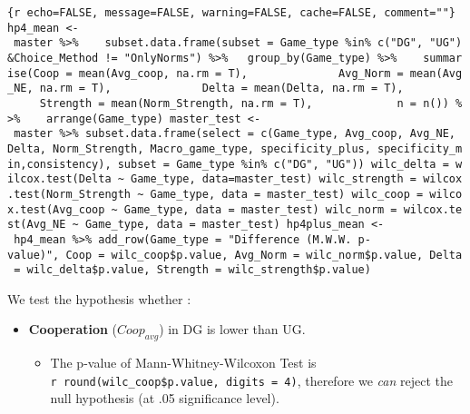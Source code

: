 \texttt{\{r\ echo=FALSE,\ message=FALSE,\ warning=FALSE,\ cache=FALSE,\ comment=""\}\ hp4\_mean\ \textless{}-\ master\ \%\textgreater{}\%\ \ \ \ subset.data.frame(subset\ =\ Game\_type\ \%in\%\ c("DG",\ "UG")\&Choice\_Method\ !=\ "OnlyNorms")\ \%\textgreater{}\%\ \ \ group\_by(Game\_type)\ \%\textgreater{}\%\ \ \ \ summarise(Coop\ =\ mean(Avg\_coop,\ na.rm\ =\ T),\ \ \ \ \ \ \ \ \ \ \ \ \ \ Avg\_Norm\ =\ mean(Avg\_NE,\ na.rm\ =\ T),\ \ \ \ \ \ \ \ \ \ \ \ \ \ Delta\ =\ mean(Delta,\ na.rm\ =\ T),\ \ \ \ \ \ \ \ \ \ \ \ \ \ Strength\ =\ mean(Norm\_Strength,\ na.rm\ =\ T),\ \ \ \ \ \ \ \ \ \ \ \ \ n\ =\ n())\ \%\textgreater{}\%\ \ \ \ arrange(Game\_type)\ master\_test\ \textless{}-\ master\ \%\textgreater{}\%\ subset.data.frame(select\ =\ c(Game\_type,\ Avg\_coop,\ Avg\_NE,\ Delta,\ Norm\_Strength,\ Macro\_game\_type,\ specificity\_plus,\ specificity\_min,consistency),\ subset\ =\ Game\_type\ \%in\%\ c("DG",\ "UG"))\ wilc\_delta\ =\ wilcox.test(Delta\ \textasciitilde{}\ Game\_type,\ data=master\_test)\ wilc\_strength\ =\ wilcox.test(Norm\_Strength\ \textasciitilde{}\ Game\_type,\ data\ =\ master\_test)\ wilc\_coop\ =\ wilcox.test(Avg\_coop\ \textasciitilde{}\ Game\_type,\ data\ =\ master\_test)\ wilc\_norm\ =\ wilcox.test(Avg\_NE\ \textasciitilde{}\ Game\_type,\ data\ =\ master\_test)\ hp4plus\_mean\ \textless{}-\ hp4\_mean\ \%\textgreater{}\%\ add\_row(Game\_type\ =\ "Difference\ (M.W.W.\ p-value)",\ Coop\ =\ wilc\_coop\$p.value,\ Avg\_Norm\ =\ wilc\_norm\$p.value,\ Delta\ =\ wilc\_delta\$p.value,\ Strength\ =\ wilc\_strength\$p.value)}

We test the hypothesis whether :

\begin{itemize}
\item
  \textbf{Cooperation} (\(Coop_{avg}\)) in DG is lower than UG.

  \begin{itemize}
  \tightlist
  \item
    The p-value of Mann-Whitney-Wilcoxon Test is
    \texttt{r\ round(wilc\_coop\$p.value,\ digits\ =\ 4)}, therefore we
    \emph{can} reject the null hypothesis (at .05 significance level).
  \end{itemize}
\end{itemize}

